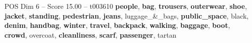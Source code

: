 \begin{textsample}{POS Dim 6 – Score 15.00 – t003610}  \label{ex:f6_pos_004}
\textbf{people}, \textbf{bag}, \textbf{trousers}, \textbf{outerwear}, \textbf{shoe}, \textbf{jacket}, \textbf{standing}, \textbf{pedestrian}, \textbf{jeans}, luggage\_\&\_bags, \textbf{public\_space}, black, \textbf{denim}, \textbf{handbag}, \textbf{winter}, \textbf{travel}, \textbf{backpack}, \textbf{walking}, \textbf{baggage}, \textbf{boot}, \textbf{crowd}, overcoat, \textbf{cleanliness}, \textbf{scarf}, \textbf{passenger}, tartan

\end{textsample}
